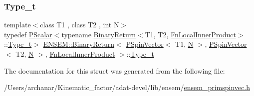 \subsubsection{\texorpdfstring{Type\_t}{Type\_t}\hspace{0.1cm}{\footnotesize\ttfamily [3/3]}}
{\footnotesize\ttfamily template$<$class T1 , class T2 , int N$>$ \\
typedef \mbox{\hyperlink{classENSEM_1_1PScalar}{P\+Scalar}}$<$typename \mbox{\hyperlink{structENSEM_1_1BinaryReturn}{Binary\+Return}}$<$T1, T2, \mbox{\hyperlink{structENSEM_1_1FnLocalInnerProduct}{Fn\+Local\+Inner\+Product}}$>$\+::\mbox{\hyperlink{structENSEM_1_1BinaryReturn_3_01PSpinVector_3_01T1_00_01N_01_4_00_01PSpinVector_3_01T2_00_01N_0165efe80400678b53a582cdf54c5c66b4_ac2b00a1c9759321859143d7e640bc27f}{Type\+\_\+t}}$>$ \mbox{\hyperlink{structENSEM_1_1BinaryReturn}{E\+N\+S\+E\+M\+::\+Binary\+Return}}$<$ \mbox{\hyperlink{classENSEM_1_1PSpinVector}{P\+Spin\+Vector}}$<$ T1, \mbox{\hyperlink{adat__devel_2lib_2hadron_2operator__name__util_8cc_a7722c8ecbb62d99aee7ce68b1752f337}{N}} $>$, \mbox{\hyperlink{classENSEM_1_1PSpinVector}{P\+Spin\+Vector}}$<$ T2, \mbox{\hyperlink{adat__devel_2lib_2hadron_2operator__name__util_8cc_a7722c8ecbb62d99aee7ce68b1752f337}{N}} $>$, \mbox{\hyperlink{structENSEM_1_1FnLocalInnerProduct}{Fn\+Local\+Inner\+Product}} $>$\+::\mbox{\hyperlink{structENSEM_1_1BinaryReturn_3_01PSpinVector_3_01T1_00_01N_01_4_00_01PSpinVector_3_01T2_00_01N_0165efe80400678b53a582cdf54c5c66b4_ac2b00a1c9759321859143d7e640bc27f}{Type\+\_\+t}}}



The documentation for this struct was generated from the following file\+:\begin{DoxyCompactItemize}
\item 
/\+Users/archanar/\+Kinematic\+\_\+factor/adat-\/devel/lib/ensem/\mbox{\hyperlink{adat-devel_2lib_2ensem_2ensem__primspinvec_8h}{ensem\+\_\+primspinvec.\+h}}\end{DoxyCompactItemize}
